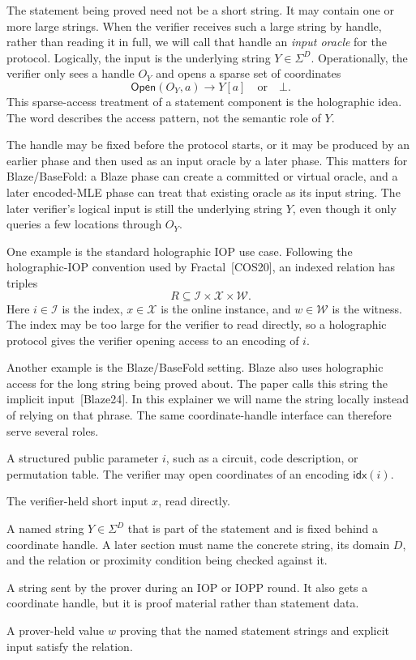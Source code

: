 The statement being proved need not be a short string.  It may contain one or
more large strings.  When the verifier receives such a large string by handle,
rather than reading it in full, we will call that handle an \emph{input oracle}
for the protocol.  Logically, the input is the underlying string
\(Y\in\Sigma^D\).  Operationally, the verifier only sees a handle \(O_Y\) and
opens a sparse set of coordinates
\[
  \mathsf{Open}(O_Y,a)\to Y[a]\quad\text{or}\quad\bot.
\]
This sparse-access treatment of a statement component is the holographic idea.
The word describes the access pattern, not the semantic role of \(Y\).

The handle may be fixed before the protocol starts, or it may be produced by an
earlier phase and then used as an input oracle by a later phase.  This matters
for Blaze/BaseFold: a Blaze phase can create a committed or virtual oracle, and
a later encoded-MLE phase can treat that existing oracle as its input string.
The later verifier's logical input is still the underlying string \(Y\), even
though it only queries a few locations through \(O_Y\).

One example is the standard holographic IOP use case.  Following the
holographic-IOP convention used by Fractal~[COS20], an indexed relation has
triples
\[
  R\subseteq \mathcal I\times\mathcal X\times\mathcal W.
\]
Here \(i\in\mathcal I\) is the index, \(x\in\mathcal X\) is the online
instance, and \(w\in\mathcal W\) is the witness.  The index may be too large for
the verifier to read directly, so a holographic protocol gives the verifier
opening access to an encoding of \(i\).

Another example is the Blaze/BaseFold setting.  Blaze also uses holographic
access for the long string being proved about.  The paper calls this string the
implicit input~[Blaze24].  In this explainer we will name the string locally
instead of relying on that phrase.  The same coordinate-handle interface can
therefore serve several roles.

\begin{description}[leftmargin=0.32in,style=nextline]
  \item[Index.]
        A structured public parameter \(i\), such as a circuit, code
        description, or permutation table.  The verifier may open coordinates
        of an encoding \(\mathsf{idx}(i)\).
  \item[Explicit input.]
        The verifier-held short input \(x\), read directly.
  \item[Long statement string.]
        A named string \(Y\in\Sigma^D\) that is part of the statement and is
        fixed behind a coordinate handle.  A later section must name the
        concrete string, its domain \(D\), and the relation or proximity
        condition being checked against it.
  \item[Prover oracle string.]
        A string sent by the prover during an IOP or IOPP round.  It also gets
        a coordinate handle, but it is proof material rather than statement
        data.
  \item[Witness.]
        A prover-held value \(w\) proving that the named statement strings and
        explicit input satisfy the relation.
\end{description}


